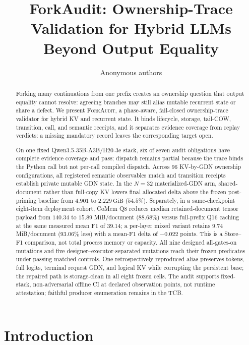 \documentclass{article}
\title{ForkAudit: Ownership-Trace Validation for Hybrid LLMs Beyond Output Equality}
\author{Anonymous authors}
\newcommand{\method}{\textsc{ForkAudit}}
\newcommand{\gib}{\,\mathrm{GiB}}
\begin{document}
\raggedbottom
\maketitle

\begin{abstract}
Forking many continuations from one prefix creates an ownership question that
output equality cannot resolve: agreeing branches may still alias mutable
recurrent state or share a defect.  We present \method{}, a phase-aware,
fail-closed ownership-trace validator for hybrid KV and recurrent state.  It
binds lifecycle, storage, tail-COW, transition, call, and semantic receipts,
and it separates evidence coverage from replay verdicts: a missing mandatory
record leaves the corresponding target open.

On one fixed Qwen3.5-35B-A3B/H20-3e stack, six of seven audit obligations have
complete evidence coverage and pass; dispatch remains partial because the trace
binds the Python call but not per-call compiled dispatch.  Across 96 KV-by-GDN
ownership configurations, all registered semantic
observables match and transition receipts establish private mutable GDN state.
In the $N=32$ materialized-GDN arm, shared-document rather than full-copy KV
lowers final allocated delta above the frozen post-priming baseline from
$4.901$ to $2.229\gib$ ($54.5\%$).  Separately, in a same-checkpoint eight-item
deployment cohort, CoMem Q8
reduces median retained-document tensor payload from $140.34$ to $15.89$
MiB/document ($88.68\%$) versus full-prefix Q16 caching at the same measured mean
F1 of $39.14$; a per-layer mixed variant retains $9.74$ MiB/document ($93.06\%$
less) with a mean-F1 delta of $-0.022$ points.  This is a Store--F1 comparison,
not total process memory or capacity.  All nine designed all-gates-on mutations
and five designer--executor-separated mutations reach their frozen predicates
under passing matched controls.  One retrospectively reproduced alias preserves
tokens, full logits, terminal request GDN, and logical KV while corrupting the
persistent base; the repaired path is storage-clean in all eight frozen cells.
The audit supports fixed-stack,
non-adversarial offline CI at declared observation points, not runtime
attestation; faithful producer enumeration remains in the TCB.
\end{abstract}

\section{Introduction}
\label{sec:intro}
\end{document}
